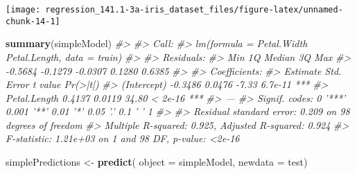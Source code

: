 \documentclass[]{book}
\newenvironment{Shaded}{\begin{snugshade}}{\end{snugshade}}
\newcommand{\CommentTok}[1]{\textcolor[rgb]{0.56,0.35,0.01}{\textit{#1}}}
\newcommand{\DataTypeTok}[1]{\textcolor[rgb]{0.13,0.29,0.53}{#1}}
\newcommand{\DecValTok}[1]{\textcolor[rgb]{0.00,0.00,0.81}{#1}}
\newcommand{\FloatTok}[1]{\textcolor[rgb]{0.00,0.00,0.81}{#1}}
\newcommand{\KeywordTok}[1]{\textcolor[rgb]{0.13,0.29,0.53}{\textbf{#1}}}
\newcommand{\NormalTok}[1]{#1}
\newcommand{\OperatorTok}[1]{\textcolor[rgb]{0.81,0.36,0.00}{\textbf{#1}}}
\newcommand{\StringTok}[1]{\textcolor[rgb]{0.31,0.60,0.02}{#1}}
\begin{document}
\begin{Shaded}
\end{Shaded}

\begin{center}\texttt{[image: regression\_141.1-3a-iris\_dataset\_files/figure-latex/unnamed-chunk-14-1]} \end{center}

\begin{Shaded}
\begin{Highlighting}[]
\KeywordTok{summary}\NormalTok{(simpleModel)}
\CommentTok{#> }
\CommentTok{#> Call:}
\CommentTok{#> lm(formula = Petal.Width ~ Petal.Length, data = train)}
\CommentTok{#> }
\CommentTok{#> Residuals:}
\CommentTok{#>     Min      1Q  Median      3Q     Max }
\CommentTok{#> -0.5684 -0.1279 -0.0307  0.1280  0.6385 }
\CommentTok{#> }
\CommentTok{#> Coefficients:}
\CommentTok{#>              Estimate Std. Error t value Pr(>|t|)    }
\CommentTok{#> (Intercept)   -0.3486     0.0476   -7.33  6.7e-11 ***}
\CommentTok{#> Petal.Length   0.4137     0.0119   34.80  < 2e-16 ***}
\CommentTok{#> ---}
\CommentTok{#> Signif. codes:  0 '***' 0.001 '**' 0.01 '*' 0.05 '.' 0.1 ' ' 1}
\CommentTok{#> }
\CommentTok{#> Residual standard error: 0.209 on 98 degrees of freedom}
\CommentTok{#> Multiple R-squared:  0.925,  Adjusted R-squared:  0.924 }
\CommentTok{#> F-statistic: 1.21e+03 on 1 and 98 DF,  p-value: <2e-16}
\end{Highlighting}
\end{Shaded}

\begin{Shaded}
\begin{Highlighting}[]
\NormalTok{simplePredictions <-}\StringTok{ }\KeywordTok{predict}\NormalTok{(}
  \DataTypeTok{object =}\NormalTok{ simpleModel,}
  \DataTypeTok{newdata =}\NormalTok{ test)}
\end{Highlighting}
\end{Shaded}
\end{document}
